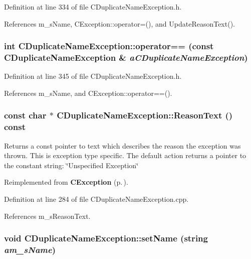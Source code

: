Definition at line 334 of file CDuplicate\-Name\-Exception.h.

References m\_\-s\-Name, CException::operator=(), and Update\-Reason\-Text().
\subsubsection{\setlength{\rightskip}{0pt plus 5cm}int CDuplicate\-Name\-Exception::operator== (const CDuplicate\-Name\-Exception \& {\em a\-CDuplicate\-Name\-Exception})\hspace{0.3cm}{\tt  [inline]}}\label{classCDuplicateNameException_a7}




Definition at line 345 of file CDuplicate\-Name\-Exception.h.

References m\_\-s\-Name, and CException::operator==().
\subsubsection{\setlength{\rightskip}{0pt plus 5cm}const char $\ast$ CDuplicate\-Name\-Exception::Reason\-Text () const\hspace{0.3cm}{\tt  [virtual]}}\label{classCDuplicateNameException_a10}


Returns a const pointer to text which describes the reason the exception was thrown. This is exception type specific. The default action returns a pointer to the constant string: \char`\"{}Unspecified Exception\char`\"{} 

Reimplemented from {\bf CException} {\rm (p.\,\pageref{classCException_a8})}.

Definition at line 284 of file CDuplicate\-Name\-Exception.cpp.

References m\_\-s\-Reason\-Text.
\subsubsection{\setlength{\rightskip}{0pt plus 5cm}void CDuplicate\-Name\-Exception::set\-Name (string {\em am\_\-s\-Name})\hspace{0.3cm}{\tt  [inline]}}\label{classCDuplicateNameException_a9}





